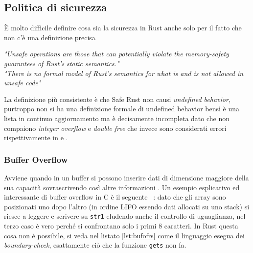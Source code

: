 \documentclass{article}
\begin{document}
\subsection{Politica di sicurezza}
È molto difficile definire cosa sia la sicurezza in Rust anche solo per il fatto che non c'è una definizione precisa
\begin{center}
	\textit{"Unsafe operations are those that can potentially violate the memory-safety guarantees of Rust's static semantics."}\cite[14]{rust:reference} \\
	\textit{"There is no formal model of Rust's semantics for what is and is not allowed in unsafe code"}\cite[14.3]{rust:reference}
\end{center}
La definizione più consistente è che Safe Rust non causi \emph{undefined behavior}, purtroppo non si ha una definizione formale di undefined behavior bensì è una lista in continuo aggiornamento \cite[14.3]{rust:reference} ma è decisamente incompleta dato che non compaiono \emph{integer overflow} e \emph{double free} che invece sono considerati errori rispettivamente in \cite[3.2]{rust:language} e \cite[4.1]{rust:language}.

\subsubsection{Buffer Overflow}
Avviene quando in un buffer si possono inserire dati di dimensione maggiore della sua capacità sovrascrivendo così altre informazioni \cite{nist:800}. 
Un esempio esplicativo ed interessante di buffer overflow in C è il seguente ~\cite[7.5]{stallings:os}: dato che gli array sono posizionati uno dopo l'altro (in ordine LIFO essendo dati allocati su uno stack) si riesce a leggere e scrivere su \texttt{str1} eludendo anche il controllo di uguaglianza, nel terzo caso è vero perché si confrontano solo i primi 8 caratteri. In Rust questa cosa non è possibile, si veda nel listato \ref{lst:bufofrs} come il linguaggio esegua dei \emph{boundary-check}, esattamente ciò che la funzione \texttt{gets} non fa. 






\end{document}
